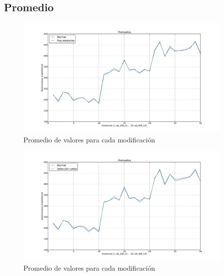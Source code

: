 \subsection{Promedio}

\begin{figure}[H]
\begin{center}
\includegraphics[width=0.95\textwidth]{img/prom-1.pdf}
\end{center}
\caption{Promedio de valores para cada modificación}
\label{fig:prom-1}
\end{figure}

\begin{figure}[H]
\begin{center}
\includegraphics[width=0.95\textwidth]{img/prom-2.pdf}
\end{center}
\caption{Promedio de valores para cada modificación}
\label{fig:prom-2}
\end{figure}


